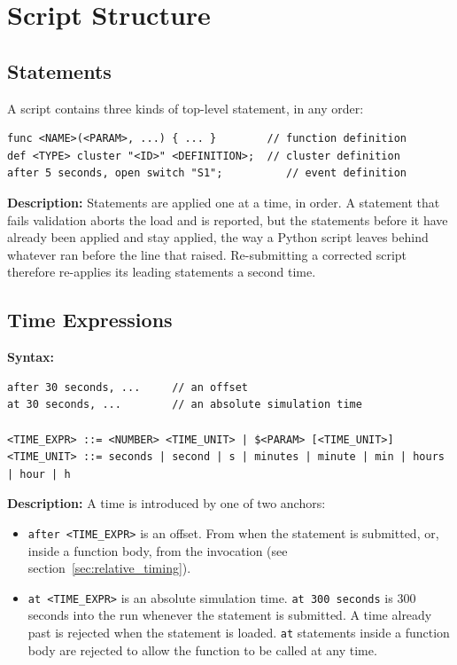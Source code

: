 \documentclass[12pt]{article}
\begin{document}
\section{Script Structure}

\subsection{Statements}

A script contains three kinds of top-level statement, in any order:

\begin{lstlisting}
func <NAME>(<PARAM>, ...) { ... }        // function definition
def <TYPE> cluster "<ID>" <DEFINITION>;  // cluster definition
after 5 seconds, open switch "S1";          // event definition
\end{lstlisting}

\textbf{Description:} Statements are applied one at a time, in order. A statement that fails validation aborts the load and is reported, but the statements before it have already been applied and stay applied, the way a Python script leaves behind whatever ran before the line that raised. Re-submitting a corrected script therefore re-applies its leading statements a second time.

\subsection{Time Expressions}

\textbf{Syntax:}
\begin{lstlisting}
after 30 seconds, ...     // an offset
at 30 seconds, ...        // an absolute simulation time

<TIME_EXPR> ::= <NUMBER> <TIME_UNIT> | $<PARAM> [<TIME_UNIT>]
<TIME_UNIT> ::= seconds | second | s | minutes | minute | min | hours | hour | h
\end{lstlisting}

\textbf{Description:} A time is introduced by one of two anchors:

\begin{itemize}
  \item \texttt{after <TIME\_EXPR>} is an offset. From when the statement is submitted, or, inside a function body, from the invocation (see section~\ref{sec:relative_timing}).
  \item \texttt{at <TIME\_EXPR>} is an absolute simulation time. \texttt{at 300 seconds} is 300 seconds into the run whenever the statement is submitted. A time already past is rejected when the statement is loaded. \texttt{at} statements inside a function body are rejected to allow the function to be called at any time.
\end{itemize}
\end{document}
